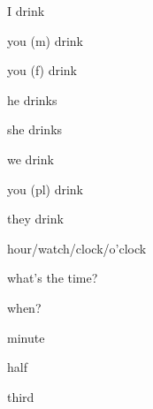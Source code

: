 

\begin{flashcard}{\LARGE I drink}
\LARGE {}
\end{flashcard}
\begin{flashcard}{\LARGE you (m) drink}
\LARGE {}
\end{flashcard}
\begin{flashcard}{\LARGE you (f) drink}
\LARGE {}
\end{flashcard}
\begin{flashcard}{\LARGE he drinks}
\LARGE {}
\end{flashcard}
\begin{flashcard}{\LARGE she drinks}
\LARGE {}
\end{flashcard}
\begin{flashcard}{\LARGE we drink}
\LARGE {}
\end{flashcard}
\begin{flashcard}{\LARGE you (pl) drink}
\LARGE {}
\end{flashcard}
\begin{flashcard}{\LARGE they drink}
\LARGE {}
\end{flashcard}
\begin{flashcard}{\LARGE hour/watch/clock/o'clock}
\LARGE {}
\end{flashcard}
\begin{flashcard}{\LARGE what's the time?}
\LARGE {}
\end{flashcard}
\begin{flashcard}{\LARGE when?}
\LARGE {}
\end{flashcard}
\begin{flashcard}{\LARGE minute}
\LARGE {}
\end{flashcard}
\begin{flashcard}{\LARGE half}
\LARGE {}
\end{flashcard}
\begin{flashcard}{\LARGE third}
\LARGE {}
\end{flashcard}
